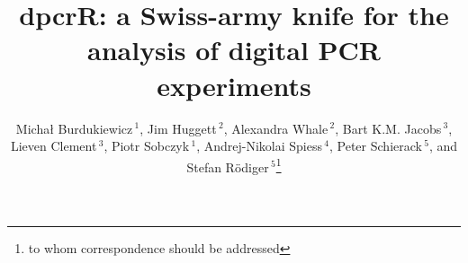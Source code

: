 \documentclass{bioinfo}
\begin{document}

\title[dpcR]{dpcrR: a Swiss-army knife for the analysis of digital PCR experiments}
\author[Burdukiewicz \textit{et~al.}]{Micha\l{} Burdukiewicz\,$^{1}$, Jim Huggett\,$^2$, Alexandra Whale\,$^2$, Bart K.M. Jacobs\,$^3$, Lieven Clement\,$^3$, Piotr Sobczyk\,$^{1}$, Andrej-Nikolai Spiess\,$^4$, Peter Schierack\,$^5$, and Stefan R\"odiger\,$^{5}$\footnote{to whom correspondence should be addressed}}
\address{$^{1}$Department of Genomics, Faculty of Biotechnology, University of 
Wroc\l{}aw, Wroc\l{}aw, Poland\\
$^{2}$Molecular and Cell Biology Team, LGC, Teddington, United Kingdom\\
$^{3}$Department of Applied Mathematics, Computer Science and Statistics, Ghent University, Belgium\\
$^{4}$University Medical Center Hamburg-Eppendorf, Hamburg, Germany\\
$^{5}$Faculty of Natural Sciences, Brandenburg University of Technology 
Cottbus--Senftenberg, Germany}



\maketitle
\end{document}
